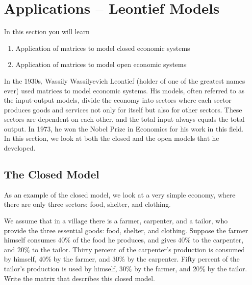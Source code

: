 \section{Applications – Leontief Models}
In this section you will learn
\begin{enumerate}
    \item Application of matrices to model closed economic systems
    \item Application of matrices to model open economic systems
\end{enumerate}

In the 1930s, Wassily Wassilyevich Leontief (holder of one of the greatest names ever) used matrices to model economic systems. His models, often referred to as the input-output models, divide the economy into sectors where each sector produces goods and services not only for itself but also for other sectors. These sectors are dependent on each other, and the total input always equals the total output. In 1973, he won the Nobel Prize in Economics for his work in this field. In this section, we look at both the closed and the open models that he developed.

\subsection{The Closed Model}
As an example of the closed model, we look at a very simple economy, where there are only three sectors: food, shelter, and clothing.


\begin{example} \label{input_output_matrix}
    We assume that in a village there is a farmer, carpenter, and a tailor, who provide the three essential goods: food, shelter, and clothing. Suppose the farmer himself consumes \(40\%\) of the food he produces, and gives \(40\%\) to the carpenter, and \(20\%\) to the tailor. Thirty percent of the carpenter's production is consumed by himself, \(40\%\) by the farmer, and \(30\%\) by the carpenter. Fifty percent of the tailor's production is used by himself, \(30\%\) by the farmer, and \(20\%\) by the tailor. Write the matrix that describes this closed model.
\end{example}

